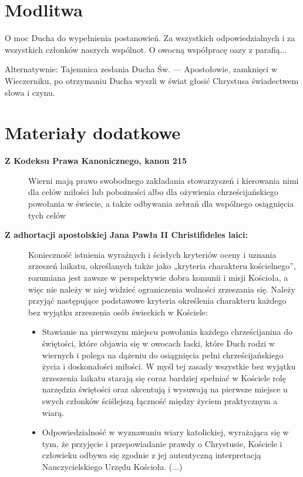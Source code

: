 \documentclass[a5paper,10pt,polish]{book}
\begin{document}
\section{Modlitwa}
\label{babice2006-jesien-gliwice/spotkanie3:id1}
O moc Ducha do wypełnienia postanowień. Za wszystkich odpowiedzialnych i za wszystkich członków naszych wspólnot. O owocną współpracę oazy z parafią...

Alternatywnie: Tajemnica zesłania Ducha Św. — Apostołowie, zamknięci w Wieczerniku, po otrzymaniu Ducha wyszli w świat głosić Chrystusa świadectwem słowa i czynu.


\section{Materiały dodatkowe}
\label{babice2006-jesien-gliwice/spotkanie3:materialy-dodatkowe}\begin{description}
\item[{\textbf{Z Kodeksu Prawa Kanonicznego, kanon 215}}] \leavevmode
Wierni  mają prawo swobodnego zakładania  stowarzyszeń  i kierowania  nimi  dla celów miłości  lub pobożności  albo dla ożywienia  chrześcijańskiego  powołania  w świecie,  a także  odbywania  zebrań dla wspólnego osiągnięcia  tych celów

\item[{\textbf{Z adhortacji apostolskiej Jana Pawła  II Christifideles laici:}}] \leavevmode
Konieczność istnienia wyraźnych i ścisłych kryteriów oceny i uznania zrzeszeń laikatu, określanych także jako „kryteria  charakteru kościelnego”, rozumiana jest zawsze w perspektywie dobra komunii  i misji Kościoła, a więc nie należy w niej  widzieć  ograniczenia  wolności zrzeszania się. Należy przyjąć następujące podstawowe kryteria określenia charakteru każdego  bez wyjątku zrzeszenia osób świeckich w Kościele:
\begin{itemize}
\item {} 
Stawianie na pierwszym miejscu powołania każdego chrześcijanina do świętości, które objawia się w owocach łaski, które Duch rodzi w wiernych i polega na dążeniu do osiągnięcia pełni chrześcijańskiego życia i doskonałości miłości. W myśl tej zasady wszystkie  bez wyjątku zrzeszenia laikatu starają się coraz bardziej spełniać w Kościele rolę narzędzia świętości oraz akcentują i wysuwają na pierwsze miejsce u swych członków ściślejszą łączność między życiem praktycznym  a wiarą.

\item {} 
Odpowiedzialność w wyznawaniu wiary katolickiej, wyrażająca się w tym, że przyjęcie  i przepowiadanie prawdy o Chrystusie, Kościele i człowieku  odbywa się zgodnie z jej autentyczną interpretacją Nauczycielskiego Urzędu Kościoła. (...)


\end{itemize}
\end{description}
\end{document}
